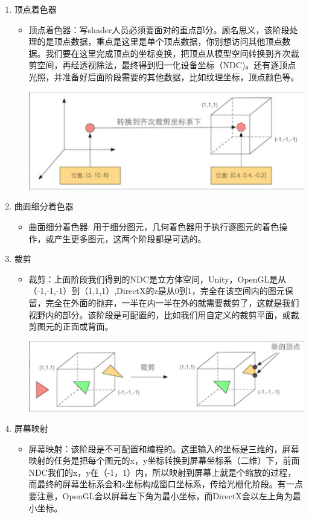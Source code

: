 \documentclass[9pt, b5paper]{article}
\begin{document}
\begin{enumerate}
\item 顶点着色器
\label{sec-1-2-2-1}
\begin{itemize}
\item 顶点着色器：写shader人员必须要面对的重点部分。顾名思义，该阶段处理的是顶点数据，重点是这里是单个顶点数据，你别想访问其他顶点数据。我们要在这里完成顶点的坐标变换，把顶点从模型空间转换到齐次裁剪空间，再经透视除法，最终得到归一化设备坐标（NDC)。还有逐顶点光照，并准备好后面阶段需要的其他数据，比如纹理坐标，顶点颜色等。

\includegraphics[width=.9\linewidth]{./pic/vertex.png}
\end{itemize}
\item 曲面细分着色器
\label{sec-1-2-2-2}
\begin{itemize}
\item 曲面细分着色器: 用于细分图元，几何着色器用于执行逐图元的着色操作，或产生更多图元，这两个阶段都是可选的。
\end{itemize}
\item 裁剪
\label{sec-1-2-2-3}
\begin{itemize}
\item 裁剪：上面阶段我们得到的NDC是立方体空间，Unity，OpenGL是从（-1,-1,-1）到（1,1,1）,DirectX的z是从0到1，完全在该空间内的图元保留，完全在外面的抛弃，一半在内一半在外的就需要裁剪了，这就是我们视野内的部分。该阶段是可配置的，比如我们用自定义的裁剪平面，或裁剪图元的正面或背面。

\includegraphics[width=.9\linewidth]{./pic/clip.png}
\end{itemize}
\item 屏幕映射
\label{sec-1-2-2-4}
\begin{itemize}
\item 屏幕映射：该阶段是不可配置和编程的。这里输入的坐标是三维的，屏幕映射的任务是把每个图元的x，y坐标转换到屏幕坐标系（二维）下，前面NDC我们的x，y在（-1，1）内，所以映射到屏幕上就是个缩放的过程，而最终的屏幕坐标系会和z坐标构成窗口坐标系，传给光栅化阶段。有一点要注意，OpenGL会以屏幕左下角为最小坐标，而DirectX会以左上角为最小坐标。


\end{itemize}
\end{enumerate}
\end{document}
